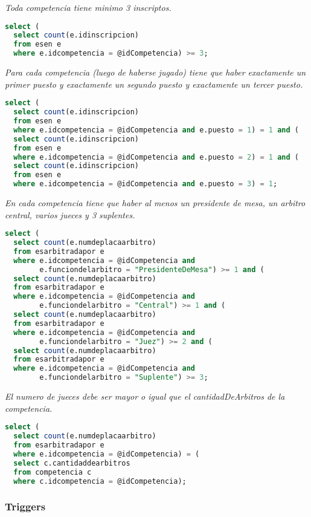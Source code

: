 \emph{Toda competencia tiene minimo 3 inscriptos.}

\begin{lstlisting}[language=SQL]
select (
  select count(e.idinscripcion)
  from esen e
  where e.idcompetencia = @idCompetencia) >= 3;
\end{lstlisting}

\emph{Para cada competencia (luego de haberse jugado) tiene que haber exactamente un primer puesto y exactamente un segundo puesto y exactamente un tercer puesto.}

\begin{lstlisting}[language=SQL]
select (
  select count(e.idinscripcion)
  from esen e
  where e.idcompetencia = @idCompetencia and e.puesto = 1) = 1 and (
  select count(e.idinscripcion)
  from esen e
  where e.idcompetencia = @idCompetencia and e.puesto = 2) = 1 and (
  select count(e.idinscripcion)
  from esen e
  where e.idcompetencia = @idCompetencia and e.puesto = 3) = 1;
\end{lstlisting}

\emph{En cada competencia tiene que haber al menos un presidente de mesa, un arbitro central, varios jueces y 3 suplentes.}

\begin{lstlisting}[language=SQL]
select (
  select count(e.numdeplacaarbitro)
  from esarbitradapor e
  where e.idcompetencia = @idCompetencia and
        e.funciondelarbitro = "PresidenteDeMesa") >= 1 and (
  select count(e.numdeplacaarbitro)
  from esarbitradapor e
  where e.idcompetencia = @idCompetencia and
        e.funciondelarbitro = "Central") >= 1 and (
  select count(e.numdeplacaarbitro)
  from esarbitradapor e
  where e.idcompetencia = @idCompetencia and
        e.funciondelarbitro = "Juez") >= 2 and (
  select count(e.numdeplacaarbitro)
  from esarbitradapor e
  where e.idcompetencia = @idCompetencia and
        e.funciondelarbitro = "Suplente") >= 3;
\end{lstlisting}

\emph{El numero de jueces debe ser mayor o igual que el cantidadDeArbitros de la competencia.}

\begin{lstlisting}[language=SQL]
select (
  select count(e.numdeplacaarbitro)
  from esarbitradapor e
  where e.idcompetencia = @idCompetencia) = (
  select c.cantidaddearbitros
  from competencia c
  where c.idcompetencia = @idCompetencia);
\end{lstlisting}

\subsubsection{Triggers}

